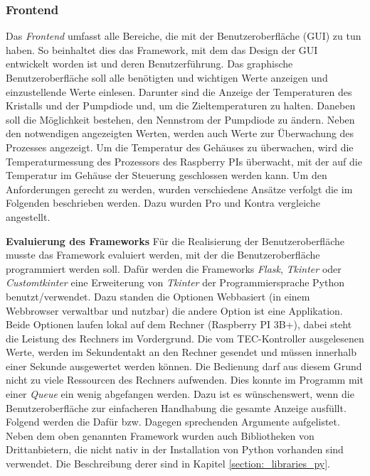 \subsubsection{Frontend}
Das \textit{Frontend} umfasst alle Bereiche, die mit der Benutzeroberfläche (GUI) zu tun haben. So beinhaltet dies das Framework, mit dem das Design der GUI entwickelt worden ist und deren Benutzerführung. 
Das graphische Benutzeroberfläche soll alle benötigten und wichtigen Werte anzeigen und einzustellende Werte einlesen. Darunter sind die Anzeige der Temperaturen des Kristalls und der Pumpdiode und, um die Zieltemperaturen zu halten. Daneben soll die Möglichkeit bestehen, den Nennstrom der Pumpdiode zu ändern. Neben den notwendigen angezeigten Werten, werden auch Werte zur Überwachung des Prozesses angezeigt. Um die Temperatur des Gehäuses zu überwachen, wird die Temperaturmessung des Prozessors des Raspberry PIs überwacht, mit der auf die Temperatur im Gehäuse der Steuerung geschlossen werden kann. Um den Anforderungen gerecht zu werden, wurden verschiedene Ansätze verfolgt die im Folgenden beschrieben werden. Dazu wurden Pro und Kontra vergleiche angestellt.

\textbf{Evaluierung des Frameworks}
Für die Realisierung der Benutzeroberfläche musste das Framework evaluiert werden, mit der die Benutzeroberfläche programmiert werden soll. Dafür werden die Frameworks \textit{Flask}, \textit{Tkinter} oder \textit{Customtkinter} eine Erweiterung von \textit{Tkinter} der Programmiersprache Python benutzt/verwendet. Dazu standen die Optionen Webbasiert (in einem Webbrowser verwaltbar und nutzbar) die andere Option ist eine Applikation. Beide Optionen laufen lokal auf dem Rechner (Raspberry PI 3B+), dabei steht die Leistung des Rechners im Vordergrund. Die vom TEC-Kontroller ausgelesenen Werte, werden im Sekundentakt an den Rechner gesendet und müssen innerhalb einer Sekunde ausgewertet werden können. Die Bedienung darf aus diesem Grund nicht zu viele Ressourcen des Rechners aufwenden. Dies konnte im Programm mit einer \textit{Queue} ein wenig abgefangen werden. Dazu ist es wünschenswert, wenn die Benutzeroberfläche zur einfacheren Handhabung die gesamte Anzeige ausfüllt. Folgend werden die Dafür bzw. Dagegen sprechenden Argumente aufgelistet.
Neben dem oben genannten Framework wurden auch Bibliotheken von Drittanbietern, die nicht nativ in der Installation von Python vorhanden sind verwendet. Die Beschreibung derer sind in Kapitel \ref{section:_libraries_py}.


